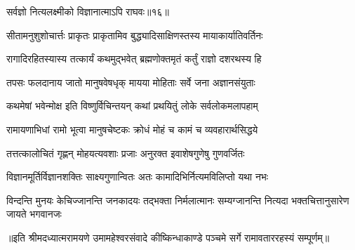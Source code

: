 



{सर्वज्ञो नित्यलक्ष्मीको विज्ञानात्माऽपि राघवः॥१६॥} %

\addtocounter{shlokacount}{17}

\twolineshloka
{सीतामनुशुशोचार्त्तः प्राकृतः प्राकृतामिव}
{बुद्ध्यादिसाक्षिणस्तस्य मायाकार्यातिवर्तिनः} %

\twolineshloka
{रागादिरहितस्यास्य तत्कार्यं कथमुद्भवेत्}
{ब्रह्मणोक्तमृतं कर्तुं राज्ञो दशरथस्य हि} %

\twolineshloka
{तपसः फलदानाय जातो मानुषवेषधृक्}
{मायया मोहिताः सर्वे जना अज्ञानसंयुताः} %

\twolineshloka
{कथमेषां भवेन्मोक्ष इति विष्णुर्विचिन्तयन्}
{कथां प्रथयितुं लोके सर्वलोकमलापहाम्} %

\twolineshloka
{रामायणाभिधां रामो भूत्वा मानुषचेष्टकः}
{क्रोधं मोहं च कामं च व्यवहारार्थसिद्धये} %

\twolineshloka
{तत्तत्कालोचितं गृह्णन् मोहयत्यवशाः प्रजाः}
{अनुरक्त इवाशेषगुणेषु गुणवर्जितः} %

\twolineshloka
{विज्ञानमूर्तिर्विज्ञानशक्तिः साक्ष्यगुणान्वितः}
{अतः कामादिभिर्नित्यमविलिप्तो यथा नभः} %

\threelineshloka
{विन्दन्ति मुनयः केचिज्जानन्ति जनकादयः}
{तद्भक्ता निर्मलात्मानः सम्यग्जानन्ति नित्यदा}
{भक्तचित्तानुसारेण जायते भगवानजः} %

{॥इति श्रीमदध्यात्मरामयणे उमामहेश्वरसंवादे
कीष्किन्धाकाण्डे पञ्चमे सर्गे  रामावताररहस्यं सम्पूर्णम्॥}
